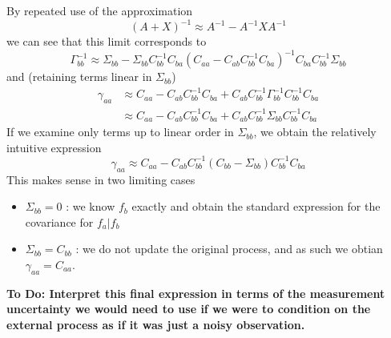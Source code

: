 \documentclass[onecolumn]{article}
\begin{document}
By repeated use of the approximation
\begin{equation}
    (A + X)^{-1} \approx A^{-1} - A^{-1} X A^{-1}
\end{equation}
we can see that this limit corresponds to
\begin{equation}
    \Gamma_{bb}^{-1} \approx \Sigma_{bb} - \Sigma_{bb} C_{bb}^{-1} C_{ba} \left( C_{aa} - C_{ab} C_{bb}^{-1} C_{ba} \right)^{-1} C_{ba} C_{bb}^{-1} \Sigma_{bb}
\end{equation}
and (retaining terms linear in $\Sigma_{bb}$)
\begin{align}
    \gamma_{aa}
        & \approx C_{aa} - C_{ab} C_{bb}^{-1} C_{ba} + C_{ab} C_{bb}^{-1} \Gamma_{bb}^{-1} C_{bb}^{-1} C_{ba} \nonumber \\
        & \approx C_{aa} - C_{ab} C_{bb}^{-1} C_{ba} + C_{ab} C_{bb}^{-1} \Sigma_{bb} C_{bb}^{-1} C_{ba}
\end{align}
If we examine only terms up to linear order in $\Sigma_{bb}$, we obtain the relatively intuitive expression
\begin{equation}
    \gamma_{aa} \approx C_{aa} - C_{ab} C_{bb}^{-1} (C_{bb} - \Sigma_{bb}) C_{bb}^{-1} C_{ba}
\end{equation}
This makes sense in two limiting cases
\begin{itemize}
    \item $\Sigma_{bb}=0$ : we know $f_b$ exactly and obtain the standard expression for the covariance for $f_a|f_b$
    \item $\Sigma_{bb}=C_{bb}$ : we do not update the original process, and as such we obtian $\gamma_{aa} = C_{aa}$.
\end{itemize}

\noindent
\textbf{To Do: Interpret this final expression in terms of the measurement uncertainty we would need to use if we were to condition on the external process as if it was just a noisy observation.
}

\end{document}
